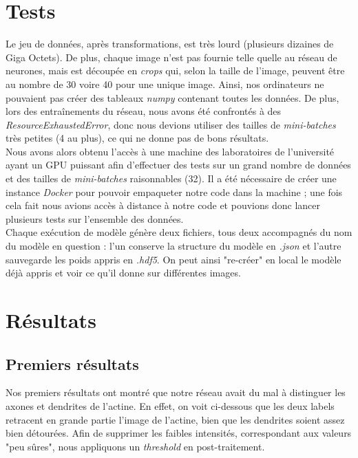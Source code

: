 \documentclass{report}
\begin{document}
\chapter{Tests}

Le jeu de données, après transformations, est très lourd (plusieurs dizaines de Giga Octets).
De plus, chaque image n'est pas fournie telle quelle au réseau de neurones, mais
est découpée en \textit{crops} qui, selon la taille de l'image, peuvent être au nombre
de 30 voire 40 pour une unique image. Ainsi, nos ordinateurs ne pouvaient pas
créer des tableaux \textit{numpy} contenant toutes les données. De plus, lors des
entraînements du réseau, nous avons été confrontés à des \textit{ResourceExhaustedError},
donc nous devions utiliser des tailles de \textit{mini-batches} très petites (4 au plus),
ce qui ne donne pas de bons résultats. \\
Nous avons alors obtenu l'accès à une machine des laboratoires de l'université ayant
un GPU puissant afin d'effectuer des tests sur un grand nombre de données et des
tailles de \textit{mini-batches} raisonnables (32). Il a été nécessaire de créer
une instance \textit{Docker} pour pouvoir empaqueter notre code dans la machine ;
une fois cela fait nous avions accès à distance à notre code et pouvions donc
lancer plusieurs tests sur l'ensemble des données. \\
Chaque exécution de modèle génère deux fichiers, tous deux accompagnés du nom du
modèle en question : l'un conserve la structure du modèle en \textit{.json} et
l'autre sauvegarde les poids appris en \textit{.hdf5}. On peut ainsi "re-créer"
en local le modèle déjà appris et voir ce qu'il donne sur différentes images.


\chapter{Résultats}

\section{Premiers résultats}

Nos premiers résultats ont montré que notre réseau avait du mal à distinguer
les axones et dendrites de l'actine. En effet, on voit ci-dessous que les deux labels
retracent en grande partie l'image de l'actine, bien que les dendrites soient assez
bien détourées. Afin de supprimer les faibles intensités, correspondant aux valeurs
"peu sûres", nous appliquons un \textit{threshold} en post-traitement.
\end{document}
